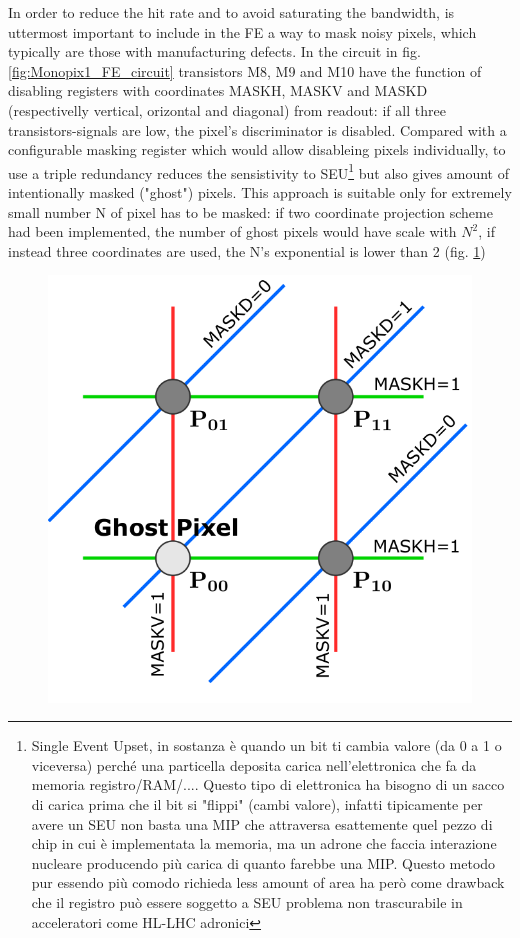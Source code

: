         In order to reduce the hit rate and to avoid saturating the bandwidth, is uttermost important to include in the FE a way to mask noisy pixels, which typically are those with manufacturing defects.
        In the circuit in fig. \ref{fig:Monopix1_FE_circuit} transistors M8, M9 and M10 have the function of disabling registers with coordinates MASKH, MASKV and MASKD (respectivelly vertical, orizontal and diagonal) from readout: if all three transistors-signals are low, the pixel's discriminator is disabled. 
        Compared with a configurable masking register which would allow disableing pixels individually, to use a triple redundancy reduces the sensistivity to SEU\footnote{Single Event Upset, in sostanza è quando un bit ti cambia valore (da 0 a 1 o viceversa) perché una particella deposita carica nell'elettronica che fa da memoria registro/RAM/.... Questo tipo di elettronica ha bisogno di un sacco di carica prima che il bit si "flippi" (cambi valore), infatti tipicamente per avere un SEU non basta una MIP che attraversa esattemente quel pezzo di chip in cui è implementata la memoria, ma un adrone che faccia interazione nucleare producendo più carica di quanto farebbe una MIP. Questo metodo pur essendo più comodo richieda less amount of area ha però come drawback che il registro può essere soggetto a SEU problema non trascurabile in acceleratori come HL-LHC adronici} but also gives amount of intentionally masked ("ghost") pixels.
        This approach is suitable only for extremely small number N of pixel has to be masked: if two coordinate projection scheme had been implemented, the number of ghost pixels would have scale with $N^2$, if instead three coordinates are used, the N's exponential is lower than 2 (fig. \ref{fig:masking_scheme})
        \begin{figure}[h!]
            \centering
            \includegraphics[width=.3\linewidth]{figures/Monopix1/masking_scheme.png}
            \caption{}
            \label{fig:masking_scheme}
        \end{figure}


